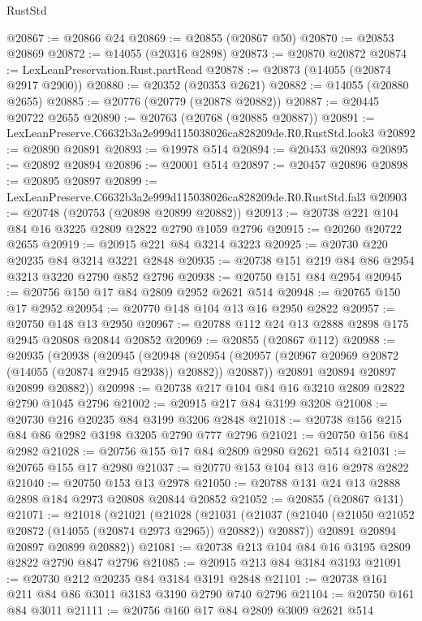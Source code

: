 \begin{lexlean}{RustStd}
\begin{coremodule}
@20867 := @20866 @24
@20869 := @20855 (@20867 @50)
@20870 := @20853 @20869
@20872 := @14055 (@20316 @2898)
@20873 := @20870 @20872
@20874 := LexLeanPreservation.Rust.partRead
@20878 := @20873 (@14055 (@20874 @2917 @2900))
@20880 := @20352 (@20353 @2621)
@20882 := @14055 (@20880 @2655)
@20885 := @20776 (@20779 (@20878 @20882))
@20887 := @20445 @20722 @2655
@20890 := @20763 (@20768 (@20885 @20887))
@20891 := LexLeanPreserve.C6632b3a2e999d115038026ca828209de.R0.RustStd.look3
@20892 := @20890 @20891
@20893 := @19978 @514
@20894 := @20453 @20893
@20895 := @20892 @20894
@20896 := @20001 @514
@20897 := @20457 @20896
@20898 := @20895 @20897
@20899 := LexLeanPreserve.C6632b3a2e999d115038026ca828209de.R0.RustStd.fal3
@20903 := @20748 (@20753 (@20898 @20899 @20882))
@20913 := @20738 @221 @104 @84 @16 @3225 @2809 @2822 @2790 @1059 @2796
@20915 := @20260 @20722 @2655
@20919 := @20915 @221 @84 @3214 @3223
@20925 := @20730 @220 @20235 @84 @3214 @3221 @2848
@20935 := @20738 @151 @219 @84 @86 @2954 @3213 @3220 @2790 @852 @2796
@20938 := @20750 @151 @84 @2954
@20945 := @20756 @150 @17 @84 @2809 @2952 @2621 @514
@20948 := @20765 @150 @17 @2952
@20954 := @20770 @148 @104 @13 @16 @2950 @2822
@20957 := @20750 @148 @13 @2950
@20967 := @20788 @112 @24 @13 @2888 @2898 @175 @2945 @20808 @20844 @20852
@20969 := @20855 (@20867 @112)
@20988 := @20935
    (@20938
      (@20945
        (@20948
          (@20954 (@20957 (@20967 @20969 @20872 (@14055 (@20874 @2945 @2938)) @20882)) @20887))
        @20891
        @20894
        @20897
        @20899
        @20882))
@20998 := @20738 @217 @104 @84 @16 @3210 @2809 @2822 @2790 @1045 @2796
@21002 := @20915 @217 @84 @3199 @3208
@21008 := @20730 @216 @20235 @84 @3199 @3206 @2848
@21018 := @20738 @156 @215 @84 @86 @2982 @3198 @3205 @2790 @777 @2796
@21021 := @20750 @156 @84 @2982
@21028 := @20756 @155 @17 @84 @2809 @2980 @2621 @514
@21031 := @20765 @155 @17 @2980
@21037 := @20770 @153 @104 @13 @16 @2978 @2822
@21040 := @20750 @153 @13 @2978
@21050 := @20788 @131 @24 @13 @2888 @2898 @184 @2973 @20808 @20844 @20852
@21052 := @20855 (@20867 @131)
@21071 := @21018
    (@21021
      (@21028
        (@21031
          (@21037 (@21040 (@21050 @21052 @20872 (@14055 (@20874 @2973 @2965)) @20882)) @20887))
        @20891
        @20894
        @20897
        @20899
        @20882))
@21081 := @20738 @213 @104 @84 @16 @3195 @2809 @2822 @2790 @847 @2796
@21085 := @20915 @213 @84 @3184 @3193
@21091 := @20730 @212 @20235 @84 @3184 @3191 @2848
@21101 := @20738 @161 @211 @84 @86 @3011 @3183 @3190 @2790 @740 @2796
@21104 := @20750 @161 @84 @3011
@21111 := @20756 @160 @17 @84 @2809 @3009 @2621 @514

\end{coremodule}
\end{lexlean}
